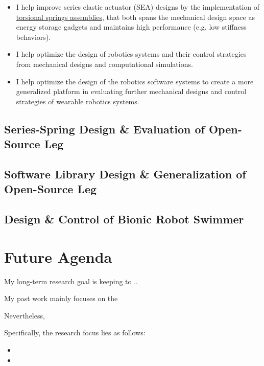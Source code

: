 \documentclass[8pt]{article}
\begin{document}
\begin{itemize}
    \item {I help improve series elastic actuator (SEA) designs by the implementation of \hyperref[sec:series-spring]{torsional springs assemblies}, that both spans the mechanical design space as energy storage gadgets and maintains high performance (e.g. low stiffness behaviors\cite{SpringDesign_OSL}).}
    \item {I help optimize the design of robotics systems and their control strategies from mechanical designs and computational simulations.}
    \item {I help optimize the design of the robotics software systems to create a more generalized platform in evaluating further mechanical designs and control strategies of wearable robotics systems.}
\end{itemize}


    \subsection{Series-Spring Design \& Evaluation of Open-Source Leg}  \label{sec:series-spring}

    \subsection{Software Library Design \& Generalization of Open-Source Leg}

    \subsection{Design \& Control of Bionic Robot Swimmer} 


\section{Future Agenda} \label{sec:Agenda}

My long-term research goal is keeping to .. 

My past work mainly focuses on the 

Nevertheless, 

Specifically, the research focus lies as follows: 

\begin{itemize}

    \item {}
    \item 
\end{itemize}



\end{document}
